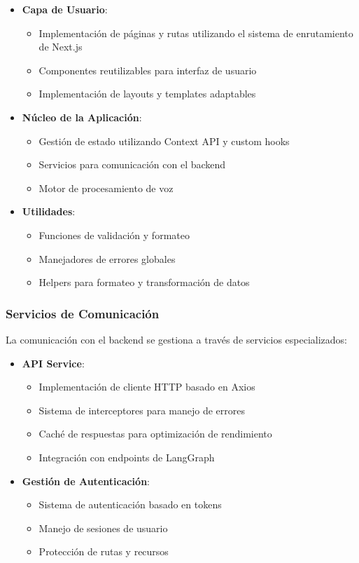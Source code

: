 \begin{itemize}
    \item \textbf{Capa de Usuario}:
    \begin{itemize}
        \item Implementación de páginas y rutas utilizando el sistema de enrutamiento de Next.js
        \item Componentes reutilizables para interfaz de usuario
        \item Implementación de layouts y templates adaptables
    \end{itemize}

    \item \textbf{Núcleo de la Aplicación}:
    \begin{itemize}
        \item Gestión de estado utilizando Context API y custom hooks
        \item Servicios para comunicación con el backend
        \item Motor de procesamiento de voz
    \end{itemize}

    \item \textbf{Utilidades}:
    \begin{itemize}
        \item Funciones de validación y formateo
        \item Manejadores de errores globales
        \item Helpers para formateo y transformación de datos
    \end{itemize}
\end{itemize}


\subsubsection{Servicios de Comunicación}
\label{servicios-comunicacion}

La comunicación con el backend se gestiona a través de servicios especializados:

\begin{itemize}
    \item \textbf{API Service}:
    \begin{itemize}
        \item Implementación de cliente HTTP basado en Axios
        \item Sistema de interceptores para manejo de errores
        \item Caché de respuestas para optimización de rendimiento
        \item Integración con endpoints de LangGraph
    \end{itemize}

    \item \textbf{Gestión de Autenticación}:
    \begin{itemize}
        \item Sistema de autenticación basado en tokens
        \item Manejo de sesiones de usuario
        \item Protección de rutas y recursos
    \end{itemize}
\end{itemize}

